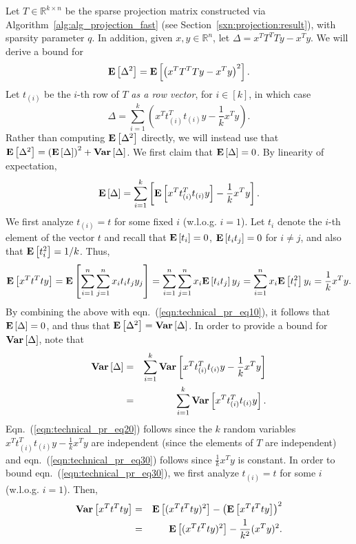 \documentclass[11pt]{article}
\newcommand{\Expect}[1]{\mbox{}{\bf{E}}\left[#1\right]}
\newcommand{\Varnce}[1]{\mbox{}{\bf{Var}}\left[#1\right]}
\begin{document}
Let $T \in \mathbb{R}^{k \times n}$ be the sparse projection matrix constructed via Algorithm~\ref{alg:alg_projection_fast} (see Section~\ref{sxn:projection:result}), with sparsity parameter $q$. In addition, given $x,y\in\mathbb{R}^{n}$, let $\Delta = x^TT^TTy-x^Ty$. We will derive a bound for $$\Expect{\Delta^2} = \Expect{\left(x^TT^TTy-x^Ty\right)^2}.$$
Let $t_{(i)}$ be the $i$-th row of $T$ \textit{as a row vector}, for $i\in[k]$, in which case
$$
\Delta = \sum_{i=1}^{k} \left( x^Tt_{(i)}^Tt_{(i)}y-\frac{1}{k}x^Ty \right)  .
$$
Rather than computing $\Expect{\Delta^2}$ directly, we will instead use that $\Expect{\Delta^2}=\left(\Expect{\Delta}\right)^2+\Varnce{\Delta}$. We first claim that $\Expect{\Delta}=0$. By linearity of expectation,
\begin{equation}
\label{eqn:technical_pr_eq10}
\Expect{\Delta}
   = \sum_{i=1}^{k} \left[ \Expect{x^Tt_{(i)}^Tt_{(i)}y}-\frac{1}{k}x^Ty  \right]   .
\end{equation}
We first analyze
$t_{(i)}=t$ for some fixed $i$ (w.l.o.g. $i=1$). Let $t_i$ denote the $i$-th element of the vector $t$ and recall that $\Expect{t_i}=0$, $\Expect{t_i t_j}=0$ for $i \ne j$,
and also that $\Expect{t_i^2}=1/k$.
Thus,
\begin{equation*}
\Expect{x^Tt^Tty}
   = \Expect{\sum_{i=1}^{n}\sum_{j=1}^{n} x_it_it_jy_j}
   = \sum_{i=1}^{n}\sum_{j=1}^{n} x_i \Expect{t_it_j} y_j
   = \sum_{i=1}^{n} x_i \Expect{t_i^2} y_i
   = \frac{1}{k} x^Ty   .
\end{equation*}
By combining the above with eqn.~(\ref{eqn:technical_pr_eq10}), it follows that
$\Expect{\Delta}=0$, and thus that $\Expect{\Delta^2}=\Varnce{\Delta}$.
In order to provide a bound for $\Varnce{\Delta}$, note that
\begin{eqnarray}
\label{eqn:technical_pr_eq20}
\Varnce{\Delta} &=& \sum_{i=1}^{k} \Varnce{ x^Tt_{(i)}^Tt_{(i)}y - \frac{1}{k}x^Ty } \\
\label{eqn:technical_pr_eq30}
            &=& \sum_{i=1}^{k} \Varnce{ x^Tt_{(i)}^Tt_{(i)}y }.
\end{eqnarray}
Eqn.~(\ref{eqn:technical_pr_eq20}) follows since the $k$ random variables
$x^Tt_{(i)}^Tt_{(i)}y-\frac{1}{k}x^Ty$ are independent (since the elements
of $T$ are independent) and eqn.~(\ref{eqn:technical_pr_eq30})
follows since $\frac{1}{k}x^Ty$ is constant.
In order to bound eqn.~(\ref{eqn:technical_pr_eq30}), we first analyze
$t_{(i)}=t$ for some $i$ (w.l.o.g. $i=1$).
Then,
\begin{eqnarray}
\nonumber
\Varnce{x^Tt^Tty}
   &=& \Expect{(x^Tt^Tty)^2} - \left(\Expect{x^Tt^Tty}\right)^2    \\
\label{eqn:eqX51}
   &=& \Expect{(x^Tt^Tty)^2} - \frac{1}{k^2}(x^Ty)^2      .
\end{eqnarray}
\end{document}
